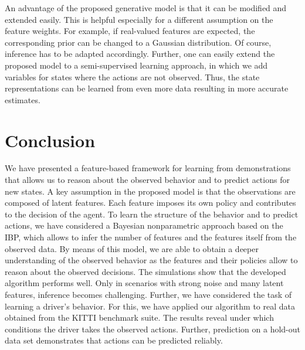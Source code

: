 \documentclass{article}
\begin{document}
An advantage of the proposed generative model is that it can be modified and extended easily. 
This is helpful especially for a different assumption on the feature weights. 
For example, if real-valued features are expected, the corresponding prior can be changed to a Gaussian distribution. 
Of course, inference has to be adapted accordingly.
Further, one can easily extend the proposed model to a semi-supervised learning approach, in which we add variables for states where the actions are not observed. 
Thus, the state representations can be learned from even more data resulting in more accurate estimates.

\section{Conclusion}
\label{sec::conclusion}
We have presented a feature-based framework for learning from demonstrations that allows us to reason about the observed behavior and to predict actions for new states.
A key assumption in the proposed model is that the observations are composed of latent features.
Each feature imposes its own policy and contributes to the decision of the agent.
To learn the structure of the behavior and to predict actions, we have considered a Bayesian nonparametric approach based on the \acl{IBP}, which allows to infer the number of features and the features itself from the observed data. 
By means of this model, we are able to obtain a deeper understanding of the observed behavior as the features and their policies allow to reason about the observed decisions. 
The simulations show that the developed algorithm performs well. 
Only in scenarios with strong noise and many latent features, inference becomes challenging.
Further, we have considered the task of learning a driver's behavior. 
For this, we have applied our algorithm to real data obtained from the KITTI benchmark suite. 
The results reveal under which conditions the driver takes the observed actions. 
Further, prediction on a hold-out data set demonstrates that actions can be predicted reliably.



\end{document}
